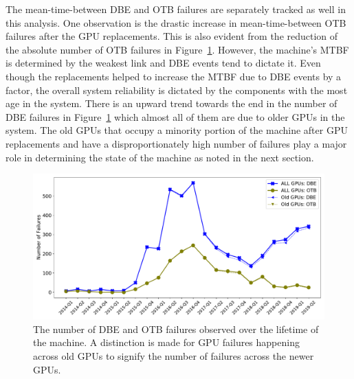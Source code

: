 The mean-time-between DBE and OTB failures are separately tracked as well in this analysis.
One observation is the drastic increase in mean-time-between OTB failures after the GPU replacements.
This is also evident from the reduction of the absolute number of OTB failures in Figure~\ref{fig:NumFails_sys}.
However, the machine's MTBF is determined by the weakest link and DBE events tend to dictate it.
Even though the replacements helped to increase the MTBF due to DBE events by a factor, the overall system 
reliability is dictated by the components with the most age in the system. There is an upward trend towards 
the end in the number of DBE failures in Figure~\ref{fig:NumFails_sys} which almost all of them are due to 
older GPUs in the system. The old GPUs that occupy a minority portion of the machine after GPU replacements
 and have a disproportionately high number of failures play a major role in determining the state of the 
machine as noted in the next section.

\begin{figure}[bt]
  \begin{center}
    \includegraphics[width=\columnwidth]{figs/NumFailures_Quarterly_newOld.pdf}
  \end{center}
  \caption{The number of DBE and OTB failures observed over the lifetime of the machine.
A distinction is made for GPU failures happening across old GPUs to signify the number 
of failures across the newer GPUs.}
  \label{fig:NumFails_sys}
\end{figure}
